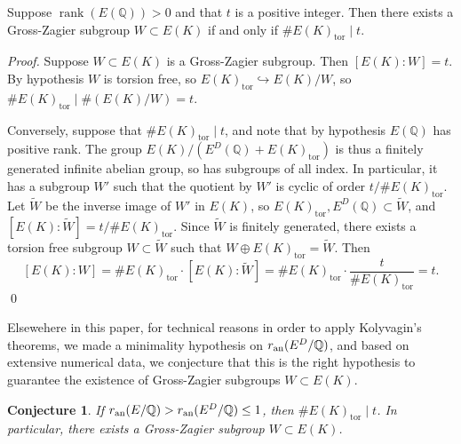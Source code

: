 \documentclass{oupau}
\DeclareMathOperator{\rank}{rank}
\DeclareMathOperator{\tor}{tor}
\newcommand{\an}{{\rm an}}
\newcommand{\QQ}{\mathbb{Q}}
\newtheorem{conjecture}[theorem]{Conjecture}
\begin{document}
\begin{proposition}\label{prop:gzcriterion}
Suppose $\rank(E(\QQ))> 0$ and that $t$ is a positive integer. 
Then there exists a Gross-Zagier subgroup $W\subset E(K)$ if and only if
$\#E(K)_{\tor} \mid t$.
\end{proposition}
\begin{proof}
Suppose $W\subset E(K)$ is a Gross-Zagier subgroup.  Then $[E(K):W] = t$. 
By hypothesis $W$ is torsion free, so $E(K)_{\tor} \hookrightarrow E(K)/W$, so 
$\#E(K)_{\tor} \mid \#(E(K)/W) = t$.  

Conversely, suppose that
$\# E(K)_{\tor} \mid t$, and note that by hypothesis $E(\QQ)$ has positive rank. 
The group $E(K)/(E^D(\QQ) + E(K)_{\tor})$ is thus a finitely generated
infinite abelian group, so has subgroups of all index.  In particular,
it has a subgroup $W'$ such that the quotient
by $W'$ is cyclic of order $t/\#E(K)_{\tor}$.
Let $\tilde{W}$ be the inverse image of $W'$ in $E(K)$, so 
$E(K)_{\tor}, E^D(\QQ) \subset \tilde{W}$,
and $[E(K):\tilde{W}] = t/\#E(K)_{\tor}$. 
Since $\tilde{W}$ is finitely generated, there exists a torsion free
subgroup $W\subset \tilde{W}$ such that $W\oplus E(K)_{\tor} = \tilde{W}$. 
Then $$
[E(K):W] = \#E(K)_{\tor} \cdot [E(K) : \tilde{W}]
          = \#E(K)_{\tor} \cdot \frac{t}{\#E(K)_{\tor}} = t.
$$
\qed\end{proof}

Elsewehere in this paper, for technical reasons in order to apply
Kolyvagin's theorems, we made a minimality hypothesis on
$r_{\an}(E^D/\QQ)$, and based on extensive numerical data, we
conjecture that this is the right hypothesis to guarantee the existence
of Gross-Zagier subgroups $W\subset E(K)$.
\begin{conjecture}\label{conj:gzgen}
  If $r_{\an}(E/\QQ) > r_{\an}(E^D/\QQ) \leq 1$, then $\#E(K)_{\tor}
  \mid t$.  In particular, there exists a Gross-Zagier subgroup
  $W\subset E(K)$.
\end{conjecture}
\end{document}
